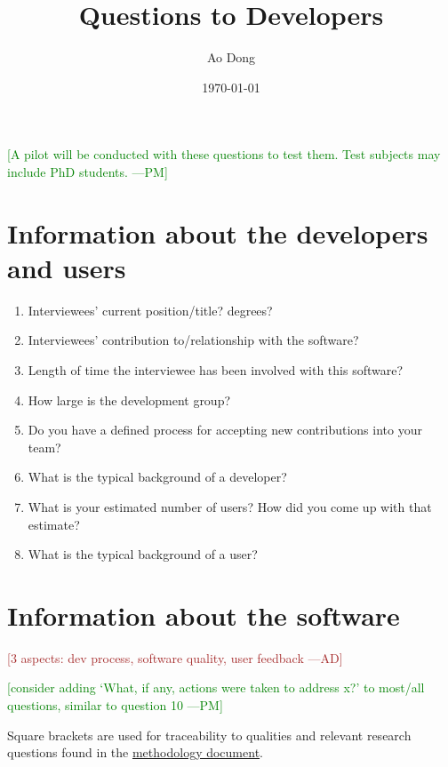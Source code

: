 \documentclass[12pt]{article}
\title{Questions to Developers}
\author{Ao Dong}
\date{\today}
\newcommand{\authornote}[3]{\textcolor{#1}{[#3 ---#2]}}
\newcommand{\authornote}[3]{}
\newcommand{\pmi}[1]{\authornote{green}{PM}{#1}} %
\newcommand{\ad}[1]{\authornote{brown}{AD}{#1}} %
\begin{document}
\maketitle
\pmi{A pilot will be conducted with these questions to test them. Test subjects may include PhD students.}
\section{Information about the developers and users}\citep{Jegatheesan2016}
\begin{enumerate}
\item Interviewees' current position/title? degrees?
\item Interviewees' contribution to/relationship with the software?
\item Length of time the interviewee has been involved with this software?
\item How large is the development group?
\item Do you have a defined process for accepting new contributions into your team?
\item What is the typical background of a developer?
\item What is your estimated number of users? How did you come up with that estimate?
\item What is the typical background of a user?
\end{enumerate}

\section{Information about the software}

\noindent\ad{3 aspects: dev process, software quality, user feedback}

\pmi{consider adding `What, if any, actions were taken to address x?' to most/all questions, similar to question 10}

Square brackets are used for traceability to qualities and relevant research questions found in the  \href{https://github.com/smiths/AIMSS/blob/master/StateOfPractice/Methodology/Methodology.pdf}{methodology document}. 
\end{document}
